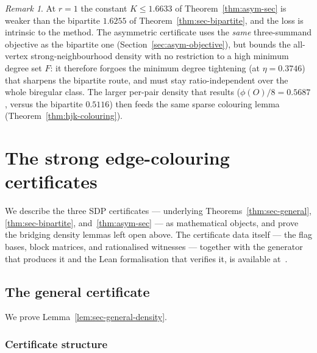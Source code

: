 \documentclass[11pt,a4paper]{article}
\theoremstyle{definition}
\theoremstyle{remark}
\newtheorem{remark}[theorem]{Remark}
\begin{document}
\begin{remark}
\label{rem:asym-looser}
At $r = 1$ the constant $K \leq 1.6633$ of
Theorem~\ref{thm:asym-sec} is weaker than the bipartite $1.6255$ of
Theorem~\ref{thm:sec-bipartite}, and the loss is intrinsic to the
method. The asymmetric certificate uses the \emph{same} three-summand
objective as the bipartite one (Section~\ref{sec:asym-objective}), but
bounds the all-vertex strong-neighbourhood density with no restriction
to a high minimum degree set $F$: it therefore forgoes the minimum degree
tightening (at $\eta = 0.3746$) that sharpens the bipartite route, and
must stay ratio-independent over the whole biregular class. The larger
per-pair density that results ($\phi(O)/8 = 0.5687$, versus the
bipartite $0.5116$) then feeds the same sparse colouring lemma
(Theorem~\ref{thm:hjk-colouring}).
\end{remark}

\section{The strong edge-colouring certificates}
\label{sec:certificates}

We describe the three SDP certificates --- underlying
Theorems~\ref{thm:sec-general}, \ref{thm:sec-bipartite},
and~\ref{thm:asym-sec} --- as mathematical objects, and prove the
bridging density lemmas left open above. The certificate data itself
--- the flag bases, block matrices, and rationalised witnesses ---
together with the generator that produces it and the Lean formalisation
that verifies it, is available at~\cite{daveyLocalFlags2024Repo}.

\subsection{The general certificate}
\label{sec:cert-general}

We prove Lemma~\ref{lem:sec-general-density}.

\subsubsection{Certificate structure}
\end{document}
